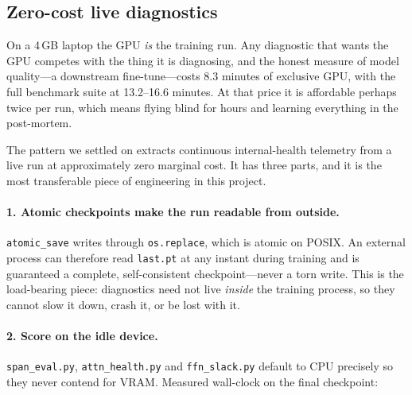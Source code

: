 \documentclass[11pt,a4paper]{article}
\begin{document}
\subsection{Zero-cost live diagnostics}\label{sec:zerocost}

On a 4\,GB laptop the GPU \emph{is} the training run. Any diagnostic that wants the GPU
competes with the thing it is diagnosing, and the honest measure of model quality---a
downstream fine-tune---costs 8.3 minutes of exclusive GPU, with the full benchmark suite at
13.2--16.6 minutes. At that price it is affordable perhaps twice per run, which means flying
blind for hours and learning everything in the post-mortem.

The pattern we settled on extracts continuous internal-health telemetry from a live run at
approximately zero marginal cost. It has three parts, and it is the most transferable piece of
engineering in this project.

\paragraph{1. Atomic checkpoints make the run readable from outside.} \texttt{atomic\_save}
writes through \texttt{os.replace}, which is atomic on POSIX. An external process can therefore
read \texttt{last.pt} at any instant during training and is guaranteed a complete,
self-consistent checkpoint---never a torn write. This is the load-bearing piece:
diagnostics need not live \emph{inside} the training process, so they cannot slow it down,
crash it, or be lost with it.

\paragraph{2. Score on the idle device.} \texttt{span\_eval.py}, \texttt{attn\_health.py} and
\texttt{ffn\_slack.py} default to CPU precisely so they never contend for VRAM. Measured
wall-clock on the final checkpoint:
\end{document}
